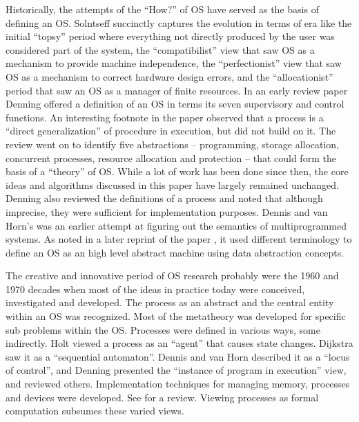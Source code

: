 \documentclass[draft]{article}
\begin{document}
Historically, the attempts  of the ``How?''  of OS  have served as the
basis        of        defining        an        OS.         Solntseff
\cite{Solntseff:1981:SOS:1164685.1164689}   succinctly   captures  the
evolution  in terms  of era  like the  initial ``topsy''  period where
everything not  directly produced by  the user was considered  part of
the system, the  ``compatibilist'' view that saw OS  as a mechanism to
provide machine  independence, the ``perfectionist'' view  that saw OS
as   a  mechanism  to   correct  hardware   design  errors,   and  the
``allocationist''  period  that saw  an  OS  as  a manager  of  finite
resources.      In      an     early     review      paper     Denning
\cite{Denning:1971:TGC:356593.356595} offered a definition of an OS in
terms  its seven  supervisory and  control functions.   An interesting
footnote  in  the  paper  observed   that  a  process  is  a  ``direct
generalization'' of procedure  in execution, but did not  build on it.
The  review went  on  to identify  five  abstractions --  programming,
storage  allocation,  concurrent  processes, resource  allocation  and
protection -- that could form the  basis of a ``theory'' of OS.  While
a lot of work has been  done since then, the core ideas and algorithms
discussed in this paper have largely remained unchanged.  Denning also
reviewed  the  definitions  of  a  process  and  noted  that  although
imprecise, they  were sufficient for  implementation purposes.  Dennis
and  van Horn's  \cite{Dennis:1966:PSM:365230.365252}  was an  earlier
attempt at figuring out  the semantics of multiprogrammed systems.  As
noted      in      a     later      reprint      of     the      paper
\cite{Dennis:1983:PSM:357980.357993}, it used different terminology to
define an OS as an  high level abstract machine using data abstraction
concepts.

The creative  and innovative period  of OS research probably  were the
1960 and  1970 decades when most  of the ideas in  practice today were
conceived, investigated and developed.  The process as an abstract and
the  central  entity  within  an  OS  was  recognized.   Most  of  the
metatheory  was developed  for specific  sub problems  within  the OS.
Processes  were  defined  in  various  ways,  some  indirectly.   Holt
\cite{Holt:1972:DPC:850614.850627}  viewed a  process as  an ``agent''
that          causes         state          changes.          Dijkstra
\cite{Dijkstra:1968:SLS:363095.363143}   saw  it  as   a  ``sequential
automaton''.  Dennis and van Horn \cite{Dennis:1966:PSM:365230.365252}
described   it    as   a    ``locus   of   control'',    and   Denning
\cite{Denning:1971:TGC:356593.356595}  presented   the  ``instance  of
program  in  execution'' view,  and  reviewed others.   Implementation
techniques for managing memory,  processes and devices were developed.
See  \cite{Denning:1971:TGC:356593.356595}   for  a  review.   Viewing
processes as formal computation subsumes these varied views.
\end{document}
